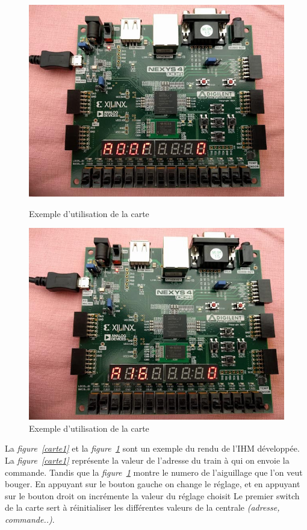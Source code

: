 \begin{figure}[h]
    \begin{minipage}[c]{.46\linewidth}
        \centering
        \includegraphics[scale=0.3]{exe_add.jpg}
        \caption{Exemple d'utilisation de la carte}
        \label{carte1}
    \end{minipage}
    \hfill%
    \begin{minipage}[c]{.46\linewidth}
        \centering
        \includegraphics[scale=0.3]{exe_aigui.jpg}
        \caption{Exemple d'utilisation de la carte}
        \label{carte2}
    \end{minipage}
\end{figure}

La \emph{figure~\ref{carte1}} et la \emph{figure~\ref{carte2}} sont un
exemple du rendu de l'IHM d\'evelopp\'ee.
La \emph{figure~\ref{carte1}} représente la valeur de l'adresse du
train à qui on envoie la commande.
Tandis que la \emph{figure~\ref{carte2}} montre le numero de
l'aiguillage que l'on veut bouger.
En appuyant sur le bouton gauche on change le réglage, et en appuyant sur le
bouton droit on incrémente la valeur du réglage choisit
Le premier switch de la carte sert à réinitialiser les différentes
valeurs de la centrale \emph{(adresse, commande..)}.


